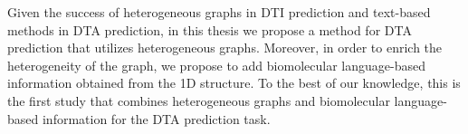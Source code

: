 Given the success of heterogeneous graphs in DTI prediction and text-based methods in DTA prediction, in this thesis we propose a method for DTA prediction that utilizes heterogeneous graphs. Moreover, in order to enrich the heterogeneity of the graph, we propose to add biomolecular language-based information obtained from the 1D structure. To the best of our knowledge, this is the first study that combines heterogeneous graphs and biomolecular language-based information for the DTA prediction task. 